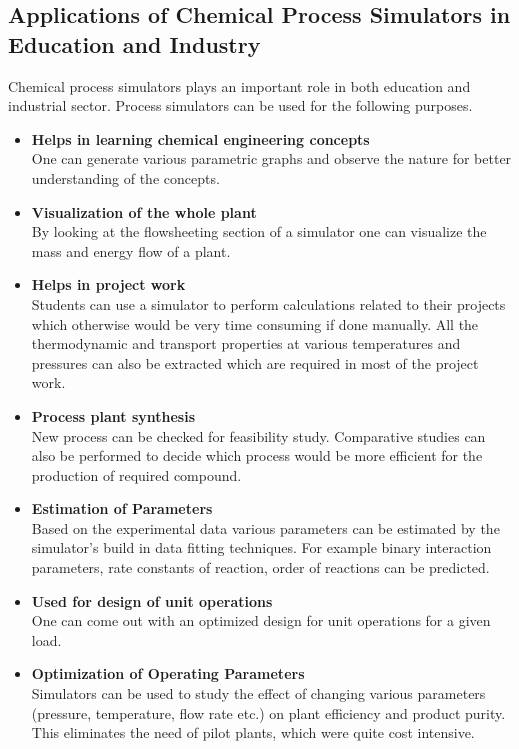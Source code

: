 \documentclass[12pt]{report}
\begin{document}
\subsection{Applications of Chemical Process Simulators in Education and Industry}
Chemical process simulators plays an important role in both education and industrial sector. Process simulators can be used for the following purposes.
\begin{itemize}
\item{\textbf{Helps in learning chemical engineering concepts}} \\
One can generate various parametric graphs and observe the nature for better understanding of the concepts.

\item{\textbf{Visualization of the whole plant}} \\
By looking at the flowsheeting section of a simulator one can visualize the mass and energy flow of a plant.

\item{\textbf{Helps in project work}} \\
Students can use a simulator to perform calculations related to their projects which otherwise would be very time consuming if done manually. All the thermodynamic and transport properties at various temperatures and pressures can also be extracted which are required in most of the project work.

\item{\textbf{Process plant synthesis}} \\
New process can be checked for feasibility study. Comparative studies can also be performed to decide which process would be more efficient for the production of required compound.

\item{\textbf{Estimation of Parameters}} \\
Based on the experimental data various parameters can be estimated by the simulator's build in data fitting techniques. For example binary interaction parameters, rate constants of reaction, order of reactions can be predicted.

\item{\textbf{Used for design of unit operations}} \\
One can come out with an optimized design for unit operations for a given load.

\item{\textbf{Optimization of Operating Parameters}} \\
Simulators can be used to study the effect of changing various parameters (pressure, temperature, flow rate etc.) on plant efficiency and product purity. This eliminates the need of pilot plants, which were quite cost intensive.


\end{itemize}
\end{document}
